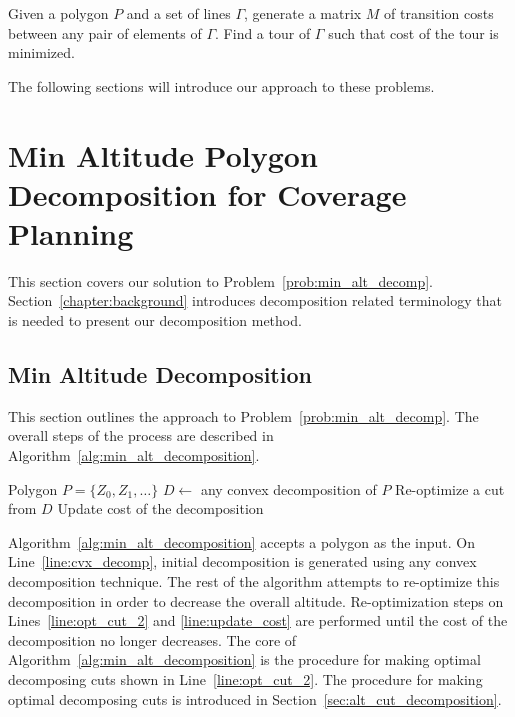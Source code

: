 \documentclass[../main.tex]{subfiles}
\begin{document}
\begin{problem}
\label{prob:min_tour}
Given a polygon $P$ and a set of lines $\Gamma$, generate a matrix $M$ of transition costs between any pair of elements of $\Gamma$. Find a tour of $\Gamma$ such that cost of the tour is minimized.
\end{problem}

The following sections will introduce our approach to these problems.

\section{Min Altitude Polygon Decomposition for Coverage Planning}
\label{section:min_alt_decomposition}

This section covers our solution to Problem~\ref{prob:min_alt_decomp}. Section~\ref{chapter:background} introduces decomposition related terminology that is needed to present our decomposition method.

\subsection{Min Altitude Decomposition}
This section outlines the approach to Problem~\ref{prob:min_alt_decomp}. The overall steps of the process are described in Algorithm~\ref{alg:min_alt_decomposition}.
\begin{algorithm}
	\caption{$\operatorname{min\_alt\_decomposition}(P)$}
	\label{alg:min_alt_decomposition}
	\begin{algorithmic}[1]
		\REQUIRE Polygon $P=\{Z_0,Z_1,\ldots\}$
			\STATE $D\gets$ any convex decomposition of $P$	\label{line:cvx_decomp}
			\REPEAT
				\STATE Re-optimize a cut from $D$ \label{line:opt_cut_2}
				\STATE Update cost of the decomposition \label{line:update_cost}
	\end{algorithmic}
\end{algorithm}

Algorithm~\ref{alg:min_alt_decomposition} accepts a polygon as the input. On Line~\ref{line:cvx_decomp}, initial decomposition is generated using any convex decomposition technique. The rest of the algorithm attempts to re-optimize this decomposition in order to decrease the overall altitude. Re-optimization steps on Lines~\ref{line:opt_cut_2} and \ref{line:update_cost} are performed until the cost of the decomposition no longer decreases. The core of Algorithm~\ref{alg:min_alt_decomposition} is the procedure for making optimal decomposing cuts shown in Line~\ref{line:opt_cut_2}. The procedure for making optimal decomposing cuts is introduced in Section~\ref{sec:alt_cut_decomposition}.
\end{document}
